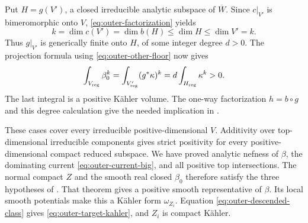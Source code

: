 Put \(H=g(V')\), a closed irreducible analytic subspace of
\(\overline W\).  Since \(c|_{V'}\) is bimeromorphic onto \(V\),
\eqref{eq:outer-factorization} yields
\[
 k=\dim c(V')=\dim b(H)\leq\dim H\leq\dim V'=k.
\]
Thus \(g|_{V'}\) is generically finite onto \(H\), of some integer
degree \(d>0\).  The projection formula using
\eqref{eq:outer-other-floor} now gives
\begin{equation}\label{eq:outer-positive-intersections}
 \int_{V_{\rm reg}}\beta_0^k
 =\int_{V'_{\rm reg}}(g^*\kappa)^k
 =d\int_{H_{\rm reg}}\kappa^k>0.
\end{equation}
The last integral is a positive K\"ahler volume.  The one-way
factorization \(h=b\circ g\) and this degree calculation give the needed
implication in \cite[proof of Theorem~7.2, p.~48]{DasHaconPaun2024}.

These cases cover every irreducible positive-dimensional \(V\).
Additivity over top-dimensional irreducible components gives strict
positivity for every positive-dimensional compact reduced subspace.
We have proved analytic nefness of \(\beta\), the dominating current
\eqref{eq:outer-current-big}, and all positive top intersections.
The normal compact \(Z\) and the smooth real closed \(\beta_0\)
therefore satisfy the three hypotheses of
\cite[Theorem~2.29]{DasHaconPaun2024}.  That theorem gives a positive
smooth representative of \(\beta\).  Its local smooth potentials make
this a K\"ahler form \(\omega_{Z_i}\).  Equation
\eqref{eq:outer-descended-class} gives
\eqref{eq:outer-target-kahler}, and \(Z_i\) is compact K\"ahler.
